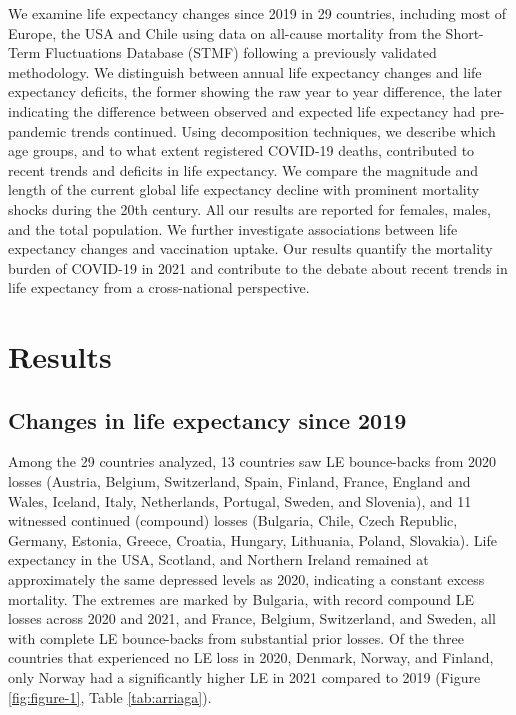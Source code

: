\documentclass[12pt]{article}
\begin{document}
We examine life expectancy changes since 2019 in 29 countries, including most of Europe, the USA and Chile using data on all-cause mortality from the Short-Term Fluctuations Database (STMF)\citealp{Nemeth2021} following a previously validated methodology.\citealp{Aburto2021b} We distinguish between annual life expectancy changes and life expectancy deficits, the former showing the raw year to year difference, the later indicating the difference between observed and expected life expectancy had pre-pandemic trends continued. Using decomposition techniques, we describe which age groups, and to what extent registered COVID-19 deaths, contributed to recent trends and deficits in life expectancy. We compare the magnitude and length of the current global life expectancy decline with prominent mortality shocks during the 20th century. All our results are reported for females, males, and the total population. We further investigate associations between life expectancy changes and vaccination uptake. Our results quantify the mortality burden of COVID-19 in 2021 and contribute to the debate about recent trends in life expectancy from a cross-national perspective.

\section*{Results}

\subsection*{Changes in life expectancy since 2019}

Among the 29 countries analyzed, 13 countries saw LE bounce-backs from 2020 losses (Austria, Belgium, Switzerland, Spain, Finland, France, England and Wales, Iceland, Italy, Netherlands, Portugal, Sweden, and Slovenia), and 11 witnessed continued (compound) losses (Bulgaria, Chile, Czech Republic, Germany, Estonia, Greece, Croatia, Hungary, Lithuania, Poland, Slovakia). Life expectancy in the USA, Scotland, and Northern Ireland remained at approximately the same depressed levels as 2020, indicating a constant excess mortality. The extremes are marked by Bulgaria, with record compound LE losses across 2020 and 2021, and France, Belgium, Switzerland, and Sweden, all with complete LE bounce-backs from substantial prior losses. Of the three countries that experienced no LE loss in 2020, Denmark, Norway, and Finland, only Norway had a significantly higher LE in 2021 compared to 2019 (Figure \ref{fig:figure-1}, Table \ref{tab:arriaga}).
\end{document}
